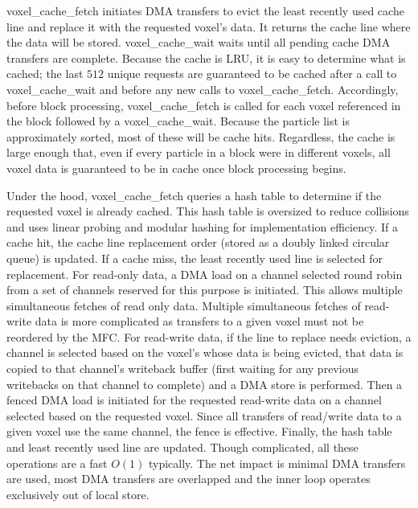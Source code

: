 \documentclass[10pt]{article}
\begin{document}
voxel\_cache\_fetch initiates DMA transfers to evict the least
recently used cache line and replace it with the requested voxel's
data.  It returns the cache line where the data will be stored.
voxel\_cache\_wait waits until all pending cache DMA transfers are
complete.  Because the cache is LRU, it is easy to determine what is
cached; the last $512$ unique requests are guaranteed to be cached
after a call to voxel\_cache\_wait and before any new calls to
voxel\_cache\_fetch.  Accordingly, before block processing,
voxel\_cache\_fetch is called for each voxel referenced in the block
followed by a voxel\_cache\_wait.  Because the particle list is
approximately sorted, most of these will be cache hits.  Regardless,
the cache is large enough that, even if every particle in a block were
in different voxels, all voxel data is guaranteed to be in cache once
block processing begins.

Under the hood, voxel\_cache\_fetch queries a hash table to determine
if the requested voxel is already cached.  This hash table is
oversized to reduce collisions and uses linear probing and modular
hashing for implementation efficiency.  If a cache hit, the cache line
replacement order (stored as a doubly linked circular queue) is
updated.  If a cache miss, the least recently used line is selected
for replacement.  For read-only data, a DMA load on a channel selected
round robin from a set of channels reserved for this purpose is
initiated.  This allows multiple simultaneous fetches of read only
data.  Multiple simultaneous fetches of read-write data is more
complicated as transfers to a given voxel must not be reordered by the
MFC.  For read-write data, if the line to replace needs eviction, a
channel is selected based on the voxel's whose data is being evicted,
that data is copied to that channel's writeback buffer (first waiting
for any previous writebacks on that channel to complete) and a DMA
store is performed.  Then a fenced DMA load is initiated for the
requested read-write data on a channel selected based on the requested
voxel.  Since all transfers of read/write data to a given voxel use
the same channel, the fence is effective.  Finally, the hash table and
least recently used line are updated.  Though complicated, all these
operations are a fast $O(1)$ typically.  The net impact is minimal DMA
transfers are used, most DMA transfers are overlapped and the inner
loop operates exclusively out of local store.

\end{document}
